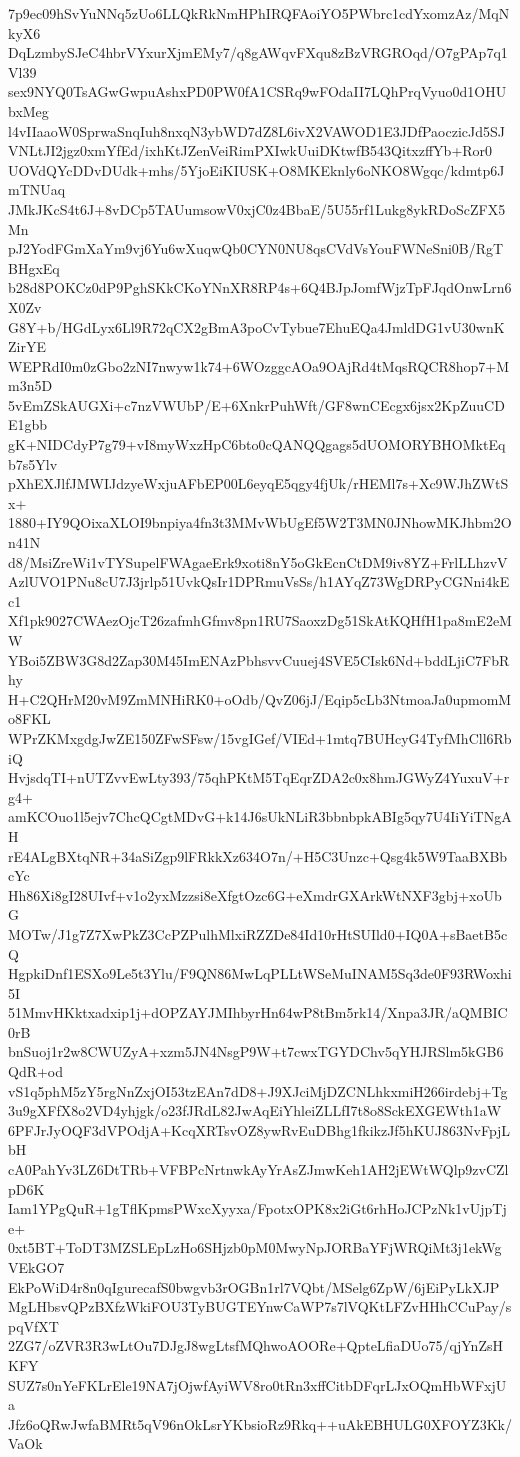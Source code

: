 7p9ec09hSvYuNNq5zUo6LLQkRkNmHPhIRQFAoiYO5PWbrc1cdYxomzAz/MqNkyX6
DqLzmbySJeC4hbrVYxurXjmEMy7/q8gAWqvFXqu8zBzVRGROqd/O7gPAp7q1Vl39
sex9NYQ0TsAGwGwpuAshxPD0PW0fA1CSRq9wFOdaII7LQhPrqVyuo0d1OHUbxMeg
l4vIIaaoW0SprwaSnqIuh8nxqN3ybWD7dZ8L6ivX2VAWOD1E3JDfPaoczicJd5SJ
VNLtJI2jgz0xmYfEd/ixhKtJZenVeiRimPXIwkUuiDKtwfB543QitxzffYb+Ror0
UOVdQYcDDvDUdk+mhs/5YjoEiKIUSK+O8MKEknly6oNKO8Wgqc/kdmtp6JmTNUaq
JMkJKcS4t6J+8vDCp5TAUumsowV0xjC0z4BbaE/5U55rf1Lukg8ykRDoScZFX5Mn
pJ2YodFGmXaYm9vj6Yu6wXuqwQb0CYN0NU8qsCVdVsYouFWNeSni0B/RgTBHgxEq
b28d8POKCz0dP9PghSKkCKoYNnXR8RP4s+6Q4BJpJomfWjzTpFJqdOnwLrn6X0Zv
G8Y+b/HGdLyx6Ll9R72qCX2gBmA3poCvTybue7EhuEQa4JmldDG1vU30wnKZirYE
WEPRdI0m0zGbo2zNI7nwyw1k74+6WOzggcAOa9OAjRd4tMqsRQCR8hop7+Mm3n5D
5vEmZSkAUGXi+c7nzVWUbP/E+6XnkrPuhWft/GF8wnCEcgx6jsx2KpZuuCDE1gbb
gK+NIDCdyP7g79+vI8myWxzHpC6bto0cQANQQgags5dUOMORYBHOMktEqb7s5Ylv
pXhEXJlfJMWIJdzyeWxjuAFbEP00L6eyqE5qgy4fjUk/rHEMl7s+Xc9WJhZWtSx+
1880+IY9QOixaXLOI9bnpiya4fn3t3MMvWbUgEf5W2T3MN0JNhowMKJhbm2On41N
d8/MsiZreWi1vTYSupelFWAgaeErk9xoti8nY5oGkEcnCtDM9iv8YZ+FrlLLhzvV
AzlUVO1PNu8cU7J3jrlp51UvkQsIr1DPRmuVsSs/h1AYqZ73WgDRPyCGNni4kEc1
Xf1pk9027CWAezOjcT26zafmhGfmv8pn1RU7SaoxzDg51SkAtKQHfH1pa8mE2eMW
YBoi5ZBW3G8d2Zap30M45ImENAzPbhsvvCuuej4SVE5CIsk6Nd+bddLjiC7FbRhy
H+C2QHrM20vM9ZmMNHiRK0+oOdb/QvZ06jJ/Eqip5cLb3NtmoaJa0upmomMo8FKL
WPrZKMxgdgJwZE150ZFwSFsw/15vgIGef/VIEd+1mtq7BUHcyG4TyfMhCll6RbiQ
HvjsdqTI+nUTZvvEwLty393/75qhPKtM5TqEqrZDA2c0x8hmJGWyZ4YuxuV+rg4+
amKCOuo1l5ejv7ChcQCgtMDvG+k14J6sUkNLiR3bbnbpkABIg5qy7U4IiYiTNgAH
rE4ALgBXtqNR+34aSiZgp9lFRkkXz634O7n/+H5C3Unzc+Qsg4k5W9TaaBXBbcYc
Hh86Xi8gI28UIvf+v1o2yxMzzsi8eXfgtOzc6G+eXmdrGXArkWtNXF3gbj+xoUbG
MOTw/J1g7Z7XwPkZ3CcPZPulhMlxiRZZDe84Id10rHtSUIld0+IQ0A+sBaetB5cQ
HgpkiDnf1ESXo9Le5t3Ylu/F9QN86MwLqPLLtWSeMuINAM5Sq3de0F93RWoxhi5I
51MmvHKktxadxip1j+dOPZAYJMIhbyrHn64wP8tBm5rk14/Xnpa3JR/aQMBIC0rB
bnSuoj1r2w8CWUZyA+xzm5JN4NsgP9W+t7cwxTGYDChv5qYHJRSlm5kGB6QdR+od
vS1q5phM5zY5rgNnZxjOI53tzEAn7dD8+J9XJciMjDZCNLhkxmiH266irdebj+Tg
3u9gXFfX8o2VD4yhjgk/o23fJRdL82JwAqEiYhleiZLLfI7t8o8SckEXGEWth1aW
6PFJrJyOQF3dVPOdjA+KcqXRTsvOZ8ywRvEuDBhg1fkikzJf5hKUJ863NvFpjLbH
cA0PahYv3LZ6DtTRb+VFBPcNrtnwkAyYrAsZJmwKeh1AH2jEWtWQlp9zvCZlpD6K
Iam1YPgQuR+1gTflKpmsPWxcXyyxa/FpotxOPK8x2iGt6rhHoJCPzNk1vUjpTje+
0xt5BT+ToDT3MZSLEpLzHo6SHjzb0pM0MwyNpJORBaYFjWRQiMt3j1ekWgVEkGO7
EkPoWiD4r8n0qIgurecafS0bwgvb3rOGBn1rl7VQbt/MSelg6ZpW/6jEiPyLkXJP
MgLHbsvQPzBXfzWkiFOU3TyBUGTEYnwCaWP7s7lVQKtLFZvHHhCCuPay/spqVfXT
2ZG7/oZVR3R3wLtOu7DJgJ8wgLtsfMQhwoAOORe+QpteLfiaDUo75/qjYnZsHKFY
SUZ7s0nYeFKLrEle19NA7jOjwfAyiWV8ro0tRn3xffCitbDFqrLJxOQmHbWFxjUa
Jfz6oQRwJwfaBMRt5qV96nOkLsrYKbsioRz9Rkq++uAkEBHULG0XFOYZ3Kk/VaOk
